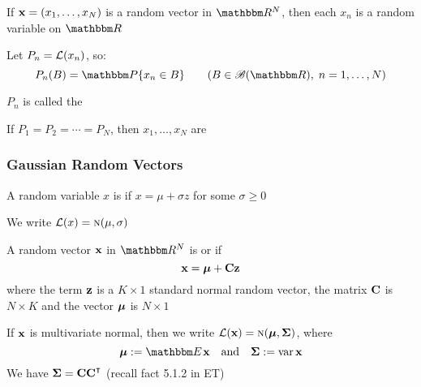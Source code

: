 \begin{frame}

    \vspace{2em}
    If ${\mathbf x} = (x_1,\ldots, x_N)$ is a random vector in $\RR^N$, then each $x_n$
    is a random variable on $\RR$
    
    \vspace{1em}
    Let $P_n = \mathcal L(x_n)$, so: 
    \begin{equation*}
        \label{eq:deffx2}
        P_n(B) = \PP \{x_n \in B \}
        \qquad (B \in \bB(\RR), \; n = 1, \ldots, N)
    \end{equation*}

    $P_n$ is called
    the 
    
    If $P_1 = P_2 = \cdots = P_N$, then $x_1, \ldots, x_N$ are 
    
\end{frame}

\begin{frame}\frametitle{Gaussian Random Vectors}
    
    \vspace{2em}
    A random variable $x$ is
     if $x = \mu + \sigma z$ for some $\sigma \geq 0$
    
    We write $\mathcal L(x) = \textrm{\sc n}(\mu, \sigma)$
    
\end{frame}

\begin{frame}
    
    \vspace{2em}
    A random vector ${\mathbf x}$ in $\RR^N$ is  or  if
    \begin{equation*}
        \label{eq:imn}
        {\mathbf x} = {\boldsymbol \mu} + \mathbf C {\mathbf z}
    \end{equation*}
    where the term ${\mathbf z}$ is a $K \times 1$ standard normal
    random vector, the matrix $\mathbf C$ is $N \times K$ and the vector ${\boldsymbol \mu}$  is $N \times 1$
    
    \vspace{1em}
    If ${\mathbf x}$ is multivariate normal, then we write $\mathcal L({\mathbf x} ) =
    \textrm{\sc n}({\boldsymbol \mu}, {\boldsymbol \Sigma})$, where
    \begin{equation*}
        \boldmu := \EE \boldx 
        \quad \text{and} \quad
        \boldSigma := \var \boldx
    \end{equation*}
    We have $\boldSigma = \boldC\boldC^\T$ (recall fact 5.1.2 in ET)
    
\end{frame}

